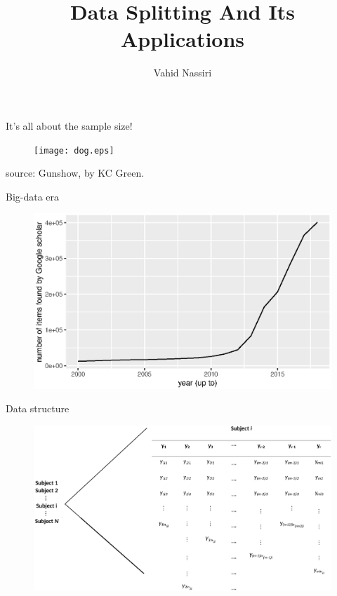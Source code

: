 \documentclass{beamer}
\title{Data Splitting And Its Applications} %
\author{Vahid Nassiri} %
\begin{document}
\begin{frame}
\titlepage %
\end{frame}

\begin{frame}{It's all about the sample size!}
\begin{figure}
\centering
\texttt{[image: dog.eps]}
\end{figure} 
source: Gunshow, by KC Green.
\end{frame}

\begin{frame}{Big-data era}
\begin{figure}
\centering
\includegraphics[width=\textwidth]{bigdata.eps}
\end{figure} 
\end{frame}


\begin{frame}{Data structure}
\begin{figure}
\centering
\includegraphics[width=\textwidth]{scheme_new.eps}
\end{figure} 

\end{frame}
\end{document}
